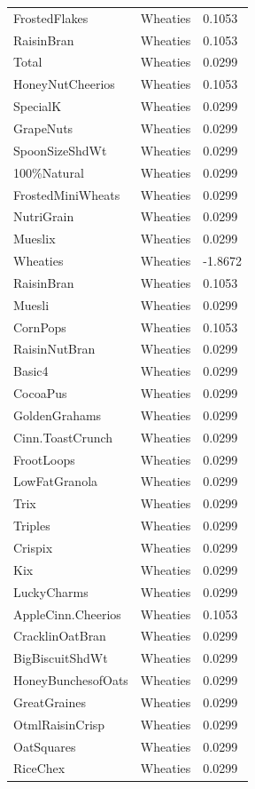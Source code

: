 \begin{table}[!htbp]
\begin{tabular}{lll}
\\
FrostedFlakes & Wheaties & 0.1053
\\
RaisinBran & Wheaties & 0.1053
\\
Total & Wheaties & 0.0299
\\
HoneyNutCheerios & Wheaties & 0.1053
\\
SpecialK & Wheaties & 0.0299
\\
GrapeNuts & Wheaties & 0.0299
\\
SpoonSizeShdWt & Wheaties & 0.0299
\\
100\%Natural & Wheaties & 0.0299
\\
FrostedMiniWheats & Wheaties & 0.0299
\\
NutriGrain & Wheaties & 0.0299
\\
Mueslix & Wheaties & 0.0299
\\
Wheaties & Wheaties & -1.8672
\\
RaisinBran & Wheaties & 0.1053
\\
Muesli & Wheaties & 0.0299
\\
CornPops & Wheaties & 0.1053
\\
RaisinNutBran & Wheaties & 0.0299
\\
Basic4 & Wheaties & 0.0299
\\
CocoaPus & Wheaties & 0.0299
\\
GoldenGrahams & Wheaties & 0.0299
\\
Cinn.ToastCrunch & Wheaties & 0.0299
\\
FrootLoops & Wheaties & 0.0299
\\
LowFatGranola & Wheaties & 0.0299
\\
Trix & Wheaties & 0.0299
\\
Triples & Wheaties & 0.0299
\\
Crispix & Wheaties & 0.0299
\\
Kix & Wheaties & 0.0299
\\
LuckyCharms & Wheaties & 0.0299
\\
AppleCinn.Cheerios & Wheaties & 0.1053
\\
CracklinOatBran & Wheaties & 0.0299
\\
BigBiscuitShdWt & Wheaties & 0.0299
\\
HoneyBunchesofOats & Wheaties & 0.0299
\\
GreatGraines & Wheaties & 0.0299
\\
OtmlRaisinCrisp & Wheaties & 0.0299
\\
OatSquares & Wheaties & 0.0299
\\
RiceChex & Wheaties & 0.0299

\end{tabular}
\end{table}
